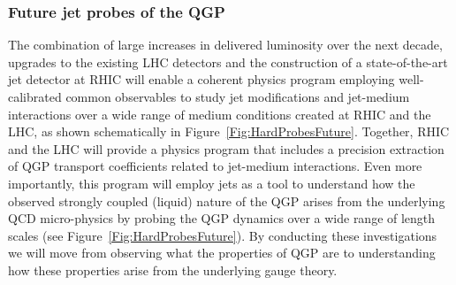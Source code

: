 \begin{enumerate}
\end{enumerate}

\subsubsection{Future jet probes of the QGP}
\label{Sec:FutureJetProbes}

The combination of large increases in delivered luminosity over the next
decade, upgrades to the existing LHC detectors and the construction
of a state-of-the-art jet detector at RHIC will enable a coherent 
physics program employing well-calibrated common observables to
study jet modifications and jet-medium interactions over a wide 
range of medium conditions created at RHIC and the LHC, as shown
schematically in Figure\ \ref{Fig:HardProbesFuture}.
Together, RHIC and the LHC will provide a physics program that includes
a precision extraction
of QGP transport coefficients related to jet-medium interactions.
Even more importantly, this program will employ jets as a tool to understand how the 
observed strongly coupled (liquid) nature of the QGP arises from the 
underlying QCD micro-physics by probing the QGP dynamics over a wide range of length scales (see Figure\ \ref{Fig:HardProbesFuture}). 
By conducting these investigations we will move from observing what the properties
of QGP are to understanding how these properties 
arise from the underlying gauge theory.
\pagebreak

